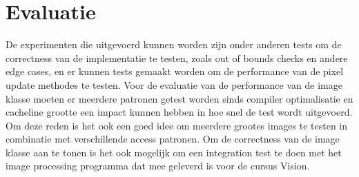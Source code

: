 \documentclass[11pt]{article}
\begin{document}
    \section{Evaluatie}\label{sec:evaluatie}
    De experimenten die uitgevoerd kunnen worden zijn onder anderen tests om de correctness van
    de implementatie te testen, zoals out of bounds checks en andere edge cases, en er kunnen
    tests gemaakt worden om de performance van de pixel update methodes te testen.
    Voor de evaluatie van de performance van de image klasse moeten er meerdere patronen getest
    worden sinds compiler optimalisatie en cacheline grootte een impact kunnen hebben in hoe snel
    de test wordt uitgevoerd.
    Om deze reden is het ook een goed idee om meerdere grootes images te testen in combinatie met
    verschillende access patronen.
    Om de correctness van de image klasse aan te tonen is het ook mogelijk om een integration
    test te doen met het image processing programma dat mee geleverd is voor de cursus Vision.
\end{document}
